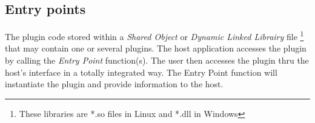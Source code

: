 \subsection{Entry points}
\noindent  The plugin code stored within a \textit{Shared Object} or \textit{Dynamic Linked Librairy} file \footnote{These libraries are *.so files in Linux and *.dll in Windows} that may contain one or several plugins. The host application accesses the plugin by calling the \textit{Entry Point} function(s). The user then accesses the plugin thru the host's interface in a totally integrated way.
 The Entry Point function will instantiate the plugin and provide information to the host.
